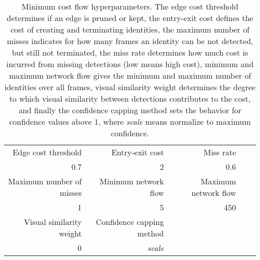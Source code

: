 \begin{table*}
    \begin{adjustbox}{max width=\textwidth,center}
        \begin{tabular}{@{}rrrrr@{}}
            \toprule
            Edge cost threshold      & Entry-exit cost           & Miss rate            &  &  \\
            0.7                      & 2                         & 0.6                  &  &  \vspace{5mm} \\
            \toprule
            Maximum number of misses & Minimum network flow      & Maximum network flow &  &  \\ 
            1                        & 5                         & 450                  &  &  \vspace{5mm} \\
            \toprule
            Visual similarity weight & Confidence capping method &                      &  &  \\
            0                        & \textit{scale}            &                      &  & \\
        \end{tabular}
    \end{adjustbox}
\caption[Minimum cost flow hyperparameters]
    {Minimum cost flow hyperparameters. The edge cost threshold determines if an
    edge is pruned or kept, the entry-exit cost defines the cost of creating and
    terminating identities, the maximum number of misses indicates for how many
    frames an identity can be not detected, but still not terminated, the miss
    rate determines how much cost is incurred from missing detections (low means
    high cost), minimum and maximum network flow gives the minimum and maximum
    number of identities over all frames, visual similarity weight determines
    the degree to which visual similarity between detections contributes to the
    cost, and finally the confidence capping method sets the behavior for
    confidence values above 1, where \textit{scale} means normalize to maximum
    confidence.}
\label{MCF_params}
\end{table*}



